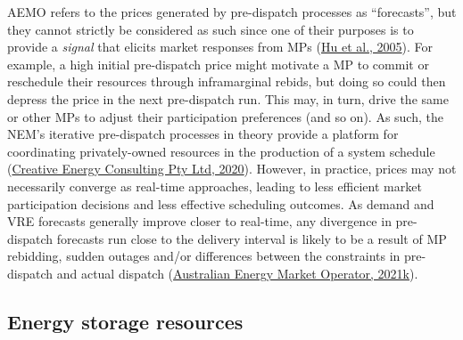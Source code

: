 \documentclass[12pt,a4paper,]{report}
\begin{document}
AEMO refers to the prices generated by pre-dispatch processes as
``forecasts'', but they cannot strictly be considered as such since one
of their purposes is to provide a \emph{signal} that elicits market
responses from MPs
(\protect\hyperlink{ref-huEmpiricalObservationsBidding2005}{Hu et al.,
2005}). For example, a high initial pre-dispatch price might motivate a
MP to commit or reschedule their resources through inframarginal rebids,
but doing so could then depress the price in the next pre-dispatch run.
This may, in turn, drive the same or other MPs to adjust their
participation preferences (and so on). As such, the NEM's iterative
pre-dispatch processes in theory provide a platform for coordinating
privately-owned resources in the production of a system schedule
(\protect\hyperlink{ref-creativeenergyconsultingptyltdSchedulingAheadMarkets2020}{Creative
Energy Consulting Pty Ltd, 2020}). However, in practice, prices may not
necessarily converge as real-time approaches, leading to less efficient
market participation decisions and less effective scheduling outcomes.
As demand and VRE forecasts generally improve closer to real-time, any
divergence in pre-dispatch forecasts run close to the delivery interval
is likely to be a result of MP rebidding, sudden outages and/or
differences between the constraints in pre-dispatch and actual dispatch
(\protect\hyperlink{ref-australianenergymarketoperatorPredispatchOperatingProcedure2021}{Australian
Energy Market Operator, 2021k}).

\hypertarget{sec:info-context-esr}{%
\subsection{Energy storage resources}\label{sec:info-context-esr}}
\end{document}
